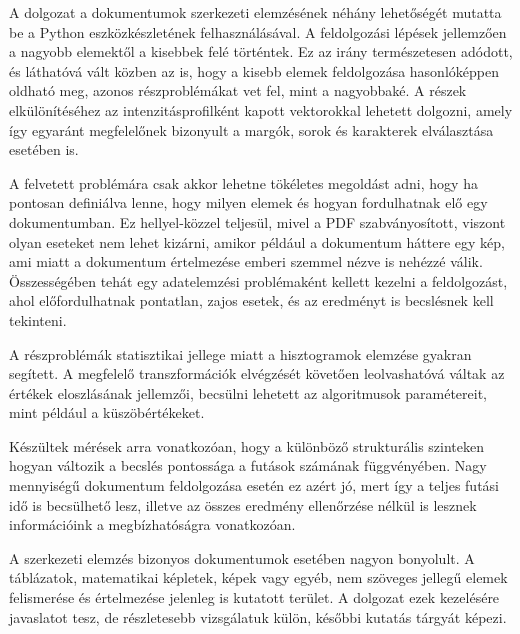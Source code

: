 
A dolgozat a dokumentumok szerkezeti elemzésének néhány lehetőségét mutatta be a Python eszközkészletének felhasználásával. A feldolgozási lépések jellemzően a nagyobb elemektől a kisebbek felé történtek. Ez az irány természetesen adódott, és láthatóvá vált közben az is, hogy a kisebb elemek feldolgozása hasonlóképpen oldható meg, azonos részproblémákat vet fel, mint a nagyobbaké. A részek elkülönítéséhez az intenzitásprofilként kapott vektorokkal lehetett dolgozni, amely így egyaránt megfelelőnek bizonyult a margók, sorok és karakterek elválasztása esetében is.

A felvetett problémára csak akkor lehetne tökéletes megoldást adni, hogy ha pontosan definiálva lenne, hogy milyen elemek és hogyan fordulhatnak elő egy dokumentumban. Ez hellyel-közzel teljesül, mivel a PDF szabványosított, viszont olyan eseteket nem lehet kizárni, amikor például a dokumentum háttere egy kép, ami miatt a dokumentum értelmezése emberi szemmel nézve is nehézzé válik. Összességében tehát egy adatelemzési problémaként kellett kezelni a feldolgozást, ahol előfordulhatnak pontatlan, zajos esetek, és az eredményt is becslésnek kell tekinteni.

A részproblémák statisztikai jellege miatt a hisztogramok elemzése gyakran segített. A megfelelő transzformációk elvégzését követően leolvashatóvá váltak az értékek eloszlásának jellemzői, becsülni lehetett az algoritmusok paramétereit, mint például a küszöbértékeket.

Készültek mérések arra vonatkozóan, hogy a különböző strukturális szinteken hogyan változik a becslés pontossága a futások számának függvényében. Nagy mennyiségű dokumentum feldolgozása esetén ez azért jó, mert így a teljes futási idő is becsülhető lesz, illetve az összes eredmény ellenőrzése nélkül is lesznek információink a megbízhatóságra vonatkozóan.

A szerkezeti elemzés bizonyos dokumentumok esetében nagyon bonyolult. A táblázatok, matematikai képletek, képek vagy egyéb, nem szöveges jellegű elemek felismerése és értelmezése jelenleg is kutatott terület. A dolgozat ezek kezelésére javaslatot tesz, de részletesebb vizsgálatuk külön, későbbi kutatás tárgyát képezi.
